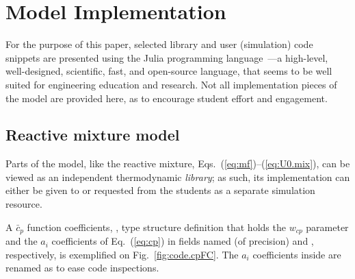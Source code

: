 
\section{Model Implementation}

    For the  purpose  of  this  paper,  selected  library  and  user  (simulation)  code  snippets  are  presented  using  the  Julia  programming  language~\cite{2012-BezansonJ+EdelmanA-CoRR,
    2017-BezansonJ+ShahVB-SIAMRev}---a high-level, well-designed, scientific, fast, and open-source language, that seems to be well suited for  engineering  education  and  research.  Not  all
    implementation pieces of the model are provided here, as to encourage student effort and engagement.

    \subsection{Reactive mixture model}

    Parts of the model, like the reactive mixture, Eqs.~(\ref{eq:mf})--(\ref{eq:U0.mix}), can be viewed as an independent thermodynamic \emph{library}; as such, its implementation  can  either
    be given to or requested from the students as a separate simulation resource.

    A $\bar{c}_p$ function coefficients, , type structure definition that holds the $w_{cp}$ parameter and the $a_i$ coefficients of Eq.~(\ref{eq:cp}) in  fields  named  
    (of precision) and , respectively, is exemplified on Fig.~\ref{fig:code.cpFC}. The $a_i$ coefficients inside  are renamed as to ease code inspections.

